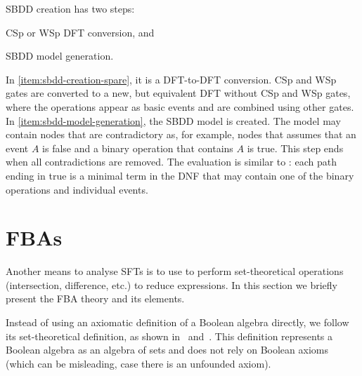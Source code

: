 \documentclass[12pt,openright,twoside,a4paper,oldfontcommands,english,brazil,final]{abntex2}
\theoremstyle{theo}
\begin{document}
\Ac{SBDD} creation has two steps:
\begin{alineasinline}
  \item \ac{CSp} or \ac{WSp} \ac{DFT} conversion, and \label{item:sbdd-creation-spare}
  \item \ac{SBDD} model generation.\label{item:sbdd-model-generation}
\end{alineasinline}
In \ref{item:sbdd-creation-spare}, it is a \ac{DFT}-to-\ac{DFT} conversion.
\Ac{CSp} and \ac{WSp} gates are converted to a new, but equivalent \ac{DFT} without \ac{CSp} and \ac{WSp} gates, where the operations appear as basic events and are combined using other gates.
In \ref{item:sbdd-model-generation}, the \ac{SBDD} model is created.
The model may contain nodes that are contradictory as, for example, nodes that assumes that an event $A$ is false and a binary operation that contains $A$ is true.
This step ends when all contradictions are removed.
The evaluation is similar to : each path ending in true is a minimal term in the \ac{DNF} that may contain one of the binary operations and individual events.


\section[Free Boolean Algebras]{\Aclp*{FBA}}
\label{sec:fba}

Another means to analyse \acp{SFT} is to use  to perform set-theoretical operations (intersection, difference, etc.) to reduce expressions.
In this section we briefly present the \ac{FBA} theory and its elements.

Instead of using an axiomatic definition of a Boolean algebra directly, we follow its set-theoretical definition, as shown in~\cite[pp. 254--258]{Stoll1979} and~\cite[pp. 8--11]{GH2009}.
This definition represents a Boolean algebra as an algebra of sets and does not rely on Boolean axioms (which can be misleading, case there is an unfounded axiom).
\end{document}
